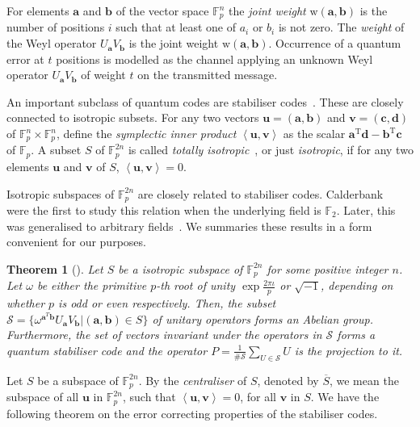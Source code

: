 \documentclass[conference]{IEEEtran}
\renewcommand{\=}{\approx}
\newcommand{\Va}{\mathbf{a}}
\newcommand{\Vb}{\mathbf{b}}
\newcommand{\weight}[1]{\ensuremath{\mathrm{w}\left(#1\right)}}
\newcommand{\symp}[2]{\ensuremath{\left\langle #1,#2 \right\rangle}}
\newcommand{\transpose}[1]{\ensuremath{#1^{\mathrm{T}}}}
\newcommand{\centraliser}[1]{\ensuremath{\overline{#1}}}
\newtheorem{theorem}{Theorem}[section]
\begin{document}
For elements $\mathbf{a}$ and $\mathbf{b}$ of the vector space
$\mathbb{F}_p^n$ the \emph{joint weight}
$\weight{\mathbf{a},\mathbf{b}}$ is the number of positions $i$ such
that at least one of $a_i$ or $b_i$ is not zero. The \emph{weight} of
the Weyl operator $U_\mathbf{a}V_\mathbf{b}$ is the joint weight
$\weight{\mathbf{a},\mathbf{b}}$. Occurrence of a quantum error at $t$
positions is modelled as the channel applying an unknown Weyl operator
$U_\mathbf{a}V_\mathbf{b}$ of weight $t$ on the transmitted message.

An important subclass of quantum codes are stabiliser
codes~\cite{gottesman:1996:error}. These are closely connected to
isotropic subsets. For any two vectors
$\mathbf{u}=(\mathbf{a},\mathbf{b})$ and
$\mathbf{v}=(\mathbf{c},\mathbf{d})$ of
$\mathbb{F}_p^{n}\times\mathbb{F}_p^n$, define the \emph{symplectic
  inner product} $\symp{\mathbf{u}}{\mathbf{v}}$ as the scalar
$\transpose{\mathbf{a}}\mathbf{d} - \transpose{\mathbf{b}}\mathbf{c}$
of $\mathbb{F}_p$.  A subset $S$ of $\mathbb{F}_p^{2n}$ is called
\emph{totally isotropic}~\cite{calderbank98quantum}, or just
\emph{isotropic}, if for any two elements $\mathbf{u}$ and
$\mathbf{v}$ of $S$, $\symp{\mathbf{u}}{\mathbf{v}} = 0$.


Isotropic subspaces of $\mathbb{F}_p^{2n}$ are closely related to
stabiliser codes. Calderbank
\etal~\cite{calderbank97orthogonal,calderbank98quantum} were the first
to study this relation when the underlying field is
$\mathbb{F}_2$. Later, this was generalised to arbitrary
fields~\cite{Ashikhmin2000nonbinary,arvind2003family}. We summaries
these results in a form convenient for our purposes.
\begin{theorem}[\cite{calderbank97orthogonal,Ashikhmin2000nonbinary,
    arvind2003family}]%
  \label{thm:iso-stab-connection}
  Let $S$ be a isotropic subspace of $\mathbb{F}_p^{2n}$ for some
  positive integer $n$. Let $\omega$ be either the primitive $p$-th
  root of unity $\exp{\frac{2\pi \iota}{p}}$ or $\sqrt{-1}$, depending
  on whether $p$ is odd or even respectively.  Then, the subset
  $\mathcal{S} = \{ \omega^{\Va^T \Vb} U_\Va V_\Vb | (\Va,\Vb) \in S
  \}$ of unitary operators forms an Abelian group. Furthermore, the
  set of vectors invariant under the operators in $\mathcal{S}$ forms
  a quantum stabiliser code and the operator
 $P = \frac{1}{\#\mathcal{S}}\sum_{U \in \mathcal{S}} U$
 is the projection to it.
\end{theorem}

Let $S$ be a subspace of $\mathbb{F}_p^{2n}$. By the
\emph{centraliser} of $S$, denoted by $\centraliser{S}$, we mean the
subspace of all $\mathbf{u}$ in $\mathbb{F}_p^{2n}$, such that
$\symp{\mathbf{u}}{\mathbf{v}} = 0$, for all $\mathbf{v}$ in $S$. We
have the following theorem on the error correcting properties of the
stabiliser codes.
\end{document}
